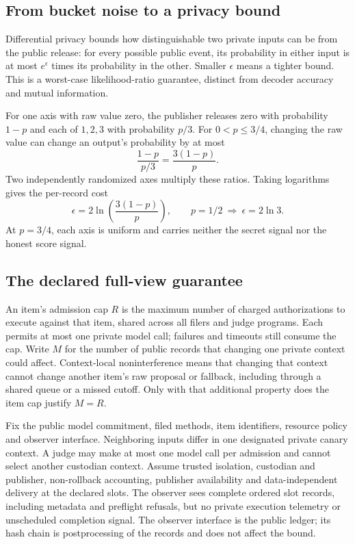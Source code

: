 \documentclass[10pt,twocolumn]{article}
\begin{document}
\subsection{From bucket noise to a privacy bound}
Differential privacy bounds how distinguishable two private inputs can be from the public release: for every possible public event, its probability in either input is at most $e^\epsilon$ times its probability in the other. Smaller $\epsilon$ means a tighter bound. This is a worst-case likelihood-ratio guarantee, distinct from decoder accuracy and mutual information.

For one axis with raw value zero, the publisher releases zero with probability $1-p$ and each of $1,2,3$ with probability $p/3$. For $0<p\leq3/4$, changing the raw value can change an output's probability by at most
\[
\frac{1-p}{p/3}=\frac{3(1-p)}p.
\]
Two independently randomized axes multiply these ratios. Taking logarithms gives the per-record cost
\[
\epsilon=2\ln\!\left(\frac{3(1-p)}p\right),\qquad
p=1/2\ \Longrightarrow\ \epsilon=2\ln3.
\]
At $p=3/4$, each axis is uniform and carries neither the secret signal nor the honest score signal.

\subsection{The declared full-view guarantee}
An item's admission cap $R$ is the maximum number of charged authorizations to execute against that item, shared across all filers and judge programs. Each permits at most one private model call; failures and timeouts still consume the cap. Write $M$ for the number of public records that changing one private context could affect. Context-local noninterference means that changing that context cannot change another item's raw proposal or fallback, including through a shared queue or a missed cutoff. Only with that additional property does the item cap justify $M=R$.

Fix the public model commitment, filed methods, item identifiers, resource policy and observer interface. Neighboring inputs differ in one designated private canary context. A judge may make at most one model call per admission and cannot select another custodian context. Assume trusted isolation, custodian and publisher, non-rollback accounting, publisher availability and data-independent delivery at the declared slots. The observer sees complete ordered slot records, including metadata and preflight refusals, but no private execution telemetry or unscheduled completion signal. The observer interface is the public ledger; its hash chain is postprocessing of the records and does not affect the bound.
\end{document}
